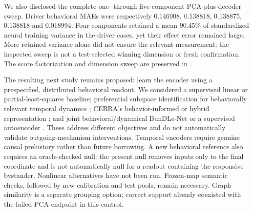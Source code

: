 We also disclosed the complete one- through five-component PCA-plus-decoder
sweep. Driver behavioral MAEs were respectively 0.146908, 0.138818, 0.138875,
0.138818 and 0.018994. Four components retained a mean 90.45\% of standardized
neural training variance in the driver cases, yet their effect error remained
large. More retained variance alone did not ensure the relevant measurement;
the inspected sweep is not a test-selected winning dimension or fresh
confirmation. The score factorization and dimension sweep are preserved in
.

The resulting next study remains proposed: learn the encoder using a
prespecified, distributed behavioral readout. We considered a supervised linear
or partial-least-squares baseline; preferential subspace identification for
behaviorally relevant temporal dynamics \citep{sani2021psid}; CEBRA's
behavior-informed or hybrid representation \citep{schneider2023cebra}; and joint
behavioral/dynamical BunDLe-Net or a supervised autoencoder
\citep{kumar2023bundleV5,le2018supervisedautoencoders}. These address different
objectives and do not automatically validate outgoing-mechanism interventions.
Temporal encoders require genuine causal prehistory rather than future
borrowing. A new behavioral reference also requires an oracle-checked null:
the present null removes inputs only to the final coordinate and is not
automatically null for a readout containing the responsive bystander. Nonlinear
alternatives have not been run. Frozen-map semantic checks, followed by new
calibration and test pools, remain necessary. Graph similarity is a separate
grouping option; correct support already coexisted with the failed PCA endpoint
in this control.
